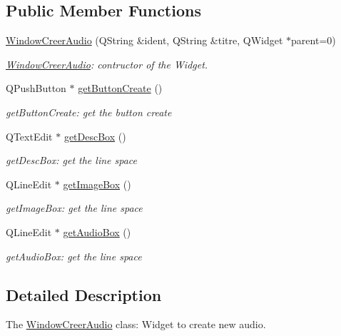 \subsection*{Public Member Functions}
\begin{DoxyCompactItemize}
\item 
\hyperlink{class_window_creer_audio_a48d3b4969c255f0565409a6dcf80014d}{Window\+Creer\+Audio} (Q\+String \&ident, Q\+String \&titre, Q\+Widget $\ast$parent=0)
\begin{DoxyCompactList}\small\item\em \hyperlink{class_window_creer_audio}{Window\+Creer\+Audio}\+: contructor of the Widget. \end{DoxyCompactList}\item 
Q\+Push\+Button $\ast$ \hyperlink{class_window_creer_audio_add4e3e8a08180957f799e465b34efc7d}{get\+Button\+Create} ()
\begin{DoxyCompactList}\small\item\em get\+Button\+Create\+: get the button create \end{DoxyCompactList}\item 
Q\+Text\+Edit $\ast$ \hyperlink{class_window_creer_audio_af644ad3d65f69e77c4d228773b010155}{get\+Desc\+Box} ()
\begin{DoxyCompactList}\small\item\em get\+Desc\+Box\+: get the line space \end{DoxyCompactList}\item 
Q\+Line\+Edit $\ast$ \hyperlink{class_window_creer_audio_a8a6ff8cfc8cfee7a68ba522af12fcb4e}{get\+Image\+Box} ()
\begin{DoxyCompactList}\small\item\em get\+Image\+Box\+: get the line space \end{DoxyCompactList}\item 
Q\+Line\+Edit $\ast$ \hyperlink{class_window_creer_audio_a906b5837d7df59111a0db173e0f48b3b}{get\+Audio\+Box} ()
\begin{DoxyCompactList}\small\item\em get\+Audio\+Box\+: get the line space \end{DoxyCompactList}\end{DoxyCompactItemize}


\subsection{Detailed Description}
The \hyperlink{class_window_creer_audio}{Window\+Creer\+Audio} class\+: Widget to create new audio. 

